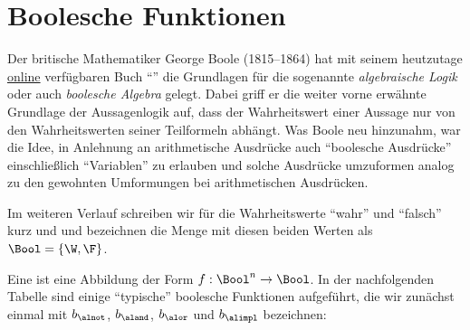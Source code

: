 \Tut\section{Boolesche Funktionen}
\label{sec:boolesche-funktionen}

\begin{window}
  \noindent
  Der britische Mathematiker George Boole (1815--1864) hat mit seinem
  heutzutage \href{http://www.gutenberg.org/ebooks/15114}{online}
  verfügbaren Buch
  "`"' \parencite{Boole_1854_LT_bk} die
  Grundlagen für die sogenannte \emph{algebraische Logik} oder auch
  \emph{boolesche Algebra} gelegt.
  Dabei griff er die weiter vorne erwähnte Grundlage der Aussagenlogik
  auf, dass der Wahrheitswert einer Aussage nur von den
  Wahrheitswerten seiner Teilformeln abhängt.
  Was Boole neu hinzunahm, war die Idee, in Anlehnung an arithmetische
  Ausdrücke auch "`boolesche Ausdrücke"' einschließlich "`Variablen"'
  zu erlauben und solche Ausdrücke umzuformen analog zu den gewohnten
  Umformungen bei arithmetischen Ausdrücken.
\end{window}

Im weiteren Verlauf schreiben wir für die Wahrheitswerte "`wahr"' und
"`falsch"' kurz \W und \F und bezeichnen die Menge mit diesen beiden
Werten als $\Bool=\{\W,\F\}$.

Eine %
 ist eine Abbildung der Form
$f: \Bool^n \to \Bool$.
%
In der nachfolgenden Tabelle sind einige "`typische"' boolesche
Funktionen aufgeführt, die wir zunächst einmal mit $b_{\alnot}$,
$b_{\aland}$, $b_{\alor}$ und $b_{\alimpl}$ bezeichnen:

